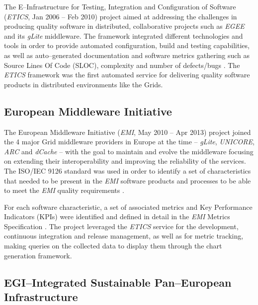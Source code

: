 \documentclass[journal]{IEEEtran}
\begin{document}
The E--Infrastructure for Testing, Integration and Configuration of Software
\cite{cordis:etics, cordis:etics2} ({\sl ETICS}, Jan 2006 -- Feb 2010) project aimed
at addressing the challenges in producing quality software in distributed,
collaborative projects such as {\sl EGEE} and its {\sl gLite} middleware. The framework
integrated different technologies and tools in order to provide automated configuration,
build and testing capabilities, as well as auto--generated documentation and
software metrics gathering such as Source Lines Of Code (SLOC), complexity and
number of defects/bugs \cite{etics}. The {\sl ETICS} framework was the first automated
service for delivering quality software products in distributed environments like
the Grids.

\subsection{European Middleware Initiative}

The European Middleware Initiative ({\sl EMI}, May 2010 -- Apr 2013)
\cite{cordis:emi} project joined the 4 major Grid middleware providers in
Europe at the time -- {\sl gLite}, {\sl UNICORE}, {\sl ARC} and {\sl dCache} --
with the goal to maintain and evolve the middleware focusing on extending their
interoperability and improving the reliability of the services. The
ISO/IEC 9126 \cite{iso-9126} standard was used in order to identify a set of
characteristics that needed to be present in the {\sl EMI} software products and
processes to be able to meet the {\sl EMI} quality requirements
\cite{emi-quality-model}.

For each software characteristic, a set of associated
metrics and Key Performance Indicators (KPIs) were identified and defined in
detail in the {\sl EMI} Metrics Specification \cite{emi-metrics}. The project
leveraged the {\sl ETICS} service for the development, continuous integration and release management,
as well as for metric tracking, making queries on the collected data to display
them through the chart generation framework.

\subsection{EGI--Integrated Sustainable Pan--European Infrastructure}
\end{document}
